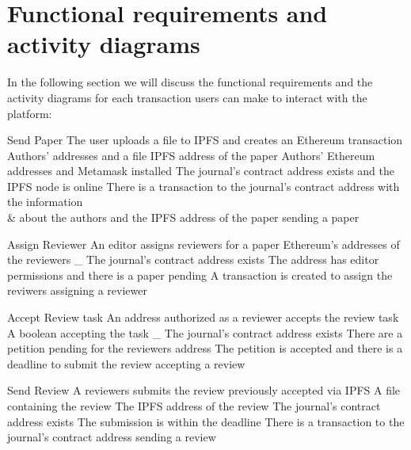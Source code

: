 \section{Functional requirements and activity diagrams}

In the following section we will discuss the functional requirements and the
activity diagrams for each transaction users can make to interact with the
platform:


{Send Paper}%
{The user uploads a file to IPFS and creates an Ethereum
  transaction}%
{Authors' addresses and a file}%
{IPFS address of the paper}%
{Authors' Ethereum addresses and Metamask installed}%
{The journal's contract address exists and the IPFS node is
  online}%
{There is a transaction to the journal's contract address with the information\\
  & about the authors and the IPFS address of the paper }%
{sending a paper}%

{Assign Reviewer}%
{An editor assigns reviewers for a paper}%
{Ethereum's addresses of the reviewers}%
{_}%
{The journal's contract address exists} {The address has editor permissions and
  there is a paper pending}%
{A transaction is created to assign the reviwers}%
{assigning a reviewer}%

{Accept Review task}%
{An address authorized as a reviewer accepts the review
  task}%
{A boolean accepting the task}%
{_}%
{The journal's contract address exists}%
{There are a petition pending for the reviewers address}%
{The petition is accepted and there is a deadline to submit the
  review}%
{accepting a review}%

{Send Review}%
{A reviewers submits the review previously accepted via
  IPFS}%
{A file containing the review}%
{The IPFS address of the review}%
{The journal's contract address exists}%
{The submission is within the deadline}%
{There is a transaction to the journal's contract address}%
{sending a review}%

